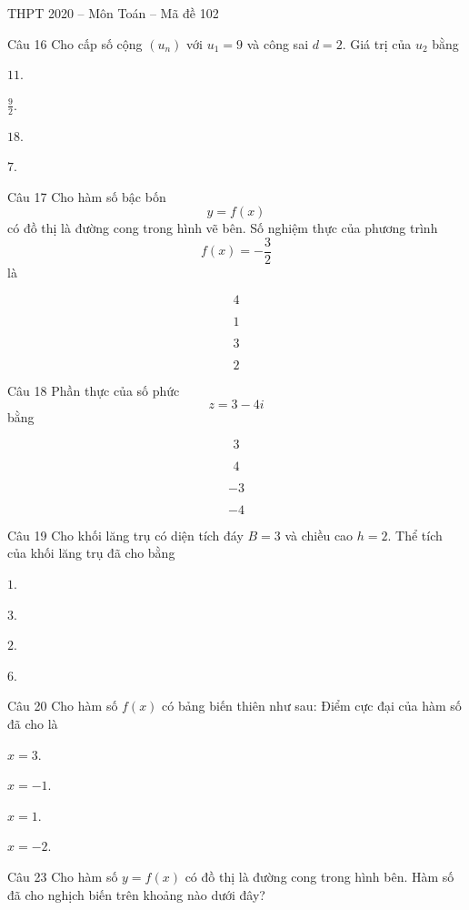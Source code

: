 \documentclass{book}
\begin{document}
\begin{quiz}{THPT 2020 – Môn Toán – Mã đề 102}
\begin{multi}[points=1]{Câu 16}
 Cho cấp số cộng $\left( {{u}_{n}} \right)$ với ${{u}_{1}}=9$ và công sai $d=2$. Giá trị của ${{u}_{2}}$ bằng

\item*  $11$.	
\item  $\frac{9}{2}$.	
\item  $18$.	
\item  $7$.
\end{multi}

\begin{multi}[points=1]{Câu 17}
 Cho hàm số bậc bốn \[y=f(x)\] có đồ thị là đường cong trong hình vẽ bên. Số nghiệm thực của phương trình \[f(x)=-\frac{3}{2}\] là

\item*  \[4\]	
\item  \[1\]	
\item  \[3\]	
\item  \[2\]
\end{multi}

\begin{multi}[points=1]{Câu 18}
 Phần thực của số phức \[z=3-4i\] bằng

\item*  \[3\]	
\item  \[4\]	
\item  \[-3\]	
\item  \[-4\]
\end{multi}

\begin{multi}[points=1]{Câu 19}
 Cho khối lăng trụ có diện tích đáy $B=3$ và chiều cao $h=2$. Thể tích của khối lăng trụ đã cho bằng

\item  $1$.	
\item  $3$.	
\item  $2$.	
\item*  $6$.
\end{multi}

\begin{multi}[points=1]{Câu 20}
 Cho hàm số $f\left( x \right)$ có bảng biến thiên như sau: 
Điểm cực đại của hàm số đã cho là

\item  $x=3$.	
\item  $x=-1$.	
\item*  $x=1$.	
\item  $x=-2$.
\end{multi}

\begin{multi}[points=1]{Câu 23}
 Cho hàm số $y=f\left( x \right)$ có đồ thị là đường cong trong hình bên. Hàm số đã cho nghịch biến trên khoảng nào dưới đây? 


\end{multi}
\end{quiz}
\end{document}
